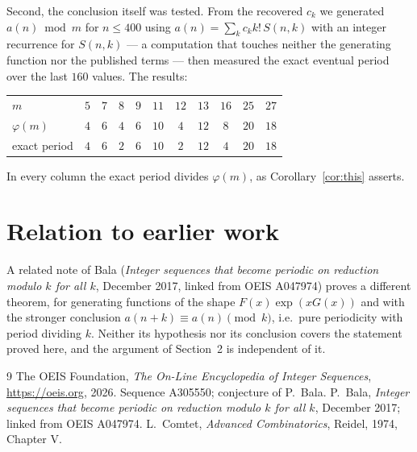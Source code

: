 \documentclass[11pt,a4paper]{article}
\theoremstyle{plain}
\theoremstyle{definition}
\begin{document}
Second, the conclusion itself was tested. From the recovered $c_{k}$ we generated
$a(n)\bmod m$ for $n\le400$ using $a(n)=\sum_{k}c_{k}k!\,S(n,k)$ with an integer
recurrence for $S(n,k)$ --- a computation that touches neither the generating function nor
the published terms --- then measured the exact eventual period over the last $160$
values. The results:

\begin{center}
\begin{tabular}{@{}lcccccccccc@{}}
\toprule
$m$  & $5$ & $7$ & $8$ & $9$ & $11$ & $12$ & $13$ & $16$ & $25$ & $27$\\
$\varphi(m)$  & $4$ & $6$ & $4$ & $6$ & $10$ & $4$ & $12$ & $8$ & $20$ & $18$\\
exact period  & $4$ & $6$ & $2$ & $6$ & $10$ & $2$ & $12$ & $4$ & $20$ & $18$\\
\bottomrule
\end{tabular}
\end{center}

\noindent
In every column the exact period divides $\varphi(m)$, as Corollary~\ref{cor:this}
asserts.

\section{Relation to earlier work}

A related note of Bala (\emph{Integer sequences that become periodic on reduction modulo
$k$ for all $k$}, December 2017, linked from OEIS A047974) proves a different theorem, for
generating functions of the shape $F(x)\exp(xG(x))$ and with the stronger conclusion
$a(n+k)\equiv a(n)\pmod{k}$, i.e.\ pure periodicity with period dividing $k$. Neither its
hypothesis nor its conclusion covers the statement proved here, and the argument of
Section~2 is independent of it.

\begin{thebibliography}{9}
 The OEIS Foundation, \emph{The On-Line Encyclopedia of Integer Sequences},
\url{https://oeis.org}, 2026. Sequence A305550; conjecture of P.\ Bala.
 P.\ Bala, \emph{Integer sequences that become periodic on reduction modulo
$k$ for all $k$}, December 2017; linked from OEIS A047974.
 L.\ Comtet, \emph{Advanced Combinatorics}, Reidel, 1974, Chapter V.
\end{thebibliography}
\end{document}
